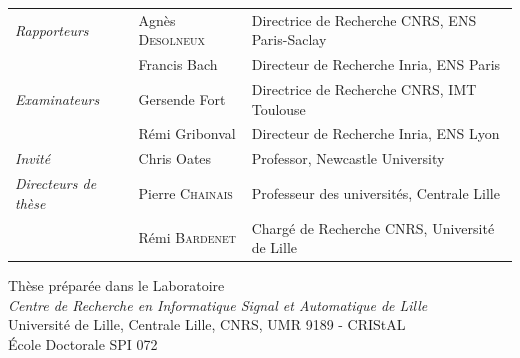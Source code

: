 {{{        \vspace{2em}

        {\begin{minipage}[b]{0.55\linewidth}
          \hspace{-2.5em}
        \end{minipage}
        \hfill
        \begin{minipage}[b]{0.49\linewidth}

        \end{minipage}}

        \vspace{0.5em}

        {\hspace{-3em}
        \begin{tabular}{lll}
        \textit{Rapporteurs}
            &   Agnès {\scshape Desolneux }
            &   Directrice de Recherche CNRS, ENS Paris-Saclay
            \\
            &   Francis Bach
            &   Directeur de Recherche Inria, ENS Paris\\
        \textit{Examinateurs}
            &   Gersende Fort
            &   Directrice de Recherche CNRS, IMT Toulouse
            \\
            &   Rémi Gribonval
            &   Directeur de Recherche Inria, ENS Lyon
            \\
        \textit{Invité}
            &   Chris Oates
            &   Professor, Newcastle University
            \\
        \textit{Directeurs de thèse}
            &   Pierre {\scshape Chainais}
            &   Professeur des universités, Centrale Lille
            \\
            &   Rémi {\scshape Bardenet}
            &   Chargé de Recherche CNRS, Université de Lille
        \end{tabular}
        }

        \vspace{2em}

        \begin{center}
            {\large Thèse préparée dans le Laboratoire} \\
            {\large \textit{Centre de Recherche en Informatique Signal et Automatique de Lille}\\ Université de Lille, Centrale Lille, CNRS, UMR 9189 - CRIStAL \\
            École Doctorale SPI 072}
        \end{center}

}}}
